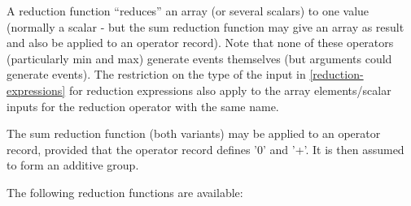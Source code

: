 A reduction function ``reduces'' an array (or several scalars) to one
value (normally a scalar - but the sum reduction function may give an
array as result and also be applied to an operator record). Note that
none of these operators (particularly min and max) generate events
themselves (but arguments could generate events). The restriction on the
type of the input in \ref{reduction-expressions} for reduction expressions also
apply to the array elements/scalar inputs for the reduction operator
with the same name.

The sum reduction function (both variants) may be applied to an operator
record, provided that the operator record defines '0' and '+'. It is
then assumed to form an additive group.

The following reduction functions are available:

